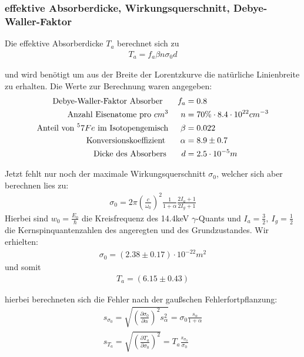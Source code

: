 \documentclass[12pt]{article}
\begin{document}
\subsubsection{effektive Absorberdicke, Wirkungsquerschnitt, Debye-Waller-Faktor}
Die effektive Absorberdicke $T_a$ berechnet sich zu
\begin{align*}
 T_a = f_a \beta n \sigma_0 d
\end{align*}

und wird benötigt um aus der Breite der Lorentzkurve die natürliche Linienbreite zu erhalten. Die Werte zur Berechnung waren angegeben:
\begin{align*}
  \textnormal{Debye-Waller-Faktor Absorber } \hspace{15pt} f_a &= 0.8 \\
  \textnormal{Anzahl Eisenatome pro }cm^3 \hspace{15pt} n &= 70\%\cdot8.4\cdot10^{22}cm^{-3} \\
  \textnormal{Anteil von }^57Fe\textnormal{ im Isotopengemisch} \hspace{15pt} \beta &= 0.022 \\
  \textnormal{Konversionskoeffizient } \hspace{15pt} \alpha &= 8.9 \pm 0.7 \\
  \textnormal{Dicke des Absorbers } \hspace{15pt} d &= 2.5 \cdot 10^{-5}m \\
\end{align*}

Jetzt fehlt nur noch der maximale Wirkungsquerschnitt $\sigma_0$, welcher sich aber berechnen lies zu:
\begin{align*}
 \sigma_0 = 2\pi \left( \frac{c}{\omega_0} \right)^2 \frac{1}{1+\alpha}\frac{2 I_a +1}{2I_g+1}
\end{align*}
Hierbei sind $w_0 = \frac{E_0}{\hbar}$ die Kreisfrequenz des 14.4keV $\gamma$-Quants und $I_a=\frac{3}{2},~I_g=\frac{1}{2}$ die Kernspinquantenzahlen
des angeregten und des Grundzustandes. Wir erhielten:
\begin{align*}
 \sigma_0 = (2.38 \pm 0.17) \cdot 10^{-22}m^2
\end{align*}
und somit
\begin{align*}
 T_a = (6.15 \pm 0.43)
\end{align*}

hierbei berechneten sich die Fehler nach der gaußschen Fehlerfortpflanzung:
\begin{align*}
 s_{\sigma_0} = \sqrt{\left( \frac{\partial \sigma_0}{\partial \alpha} \right)^2 s_{\alpha}^2 } = \sigma_0 \frac{s_{\alpha}}{1 + \alpha} \\
 s_{T_a} = \sqrt{\left( \frac{\partial T_a}{\partial \sigma_0} \right)^2 } = T_a \frac{s_{\sigma_0}}{\sigma_0}
\end{align*}
\end{document}

